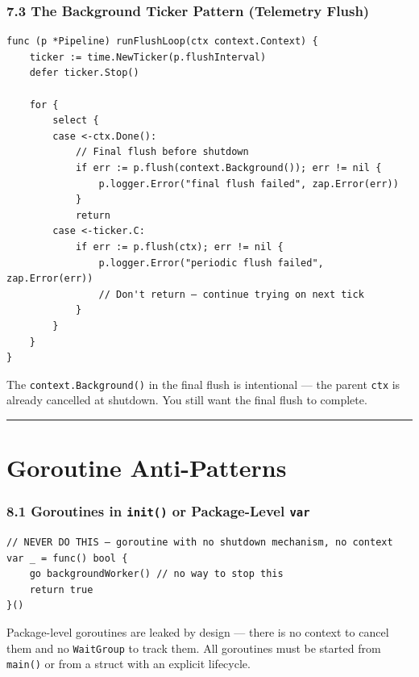 \documentclass[11pt,a4paper,oneside]{book}
\begin{document}
\subsubsection{7.3 The Background Ticker Pattern (Telemetry
Flush)}

\begin{verbatim}
func (p *Pipeline) runFlushLoop(ctx context.Context) {
    ticker := time.NewTicker(p.flushInterval)
    defer ticker.Stop()

    for {
        select {
        case <-ctx.Done():
            // Final flush before shutdown
            if err := p.flush(context.Background()); err != nil {
                p.logger.Error("final flush failed", zap.Error(err))
            }
            return
        case <-ticker.C:
            if err := p.flush(ctx); err != nil {
                p.logger.Error("periodic flush failed", zap.Error(err))
                // Don't return — continue trying on next tick
            }
        }
    }
}
\end{verbatim}

The \texttt{context.Background()} in the final flush is intentional ---
the parent \texttt{ctx} is already cancelled at shutdown. You still want
the final flush to complete.

\begin{center}\rule{0.5\linewidth}{0.5pt}\end{center}

\section{Goroutine Anti-Patterns}

\subsubsection{\texorpdfstring{8.1 Goroutines in \texttt{init()} or
Package-Level
\texttt{var}}{8.1 Goroutines in init() or Package-Level var}}

\begin{verbatim}
// NEVER DO THIS — goroutine with no shutdown mechanism, no context
var _ = func() bool {
    go backgroundWorker() // no way to stop this
    return true
}()
\end{verbatim}

Package-level goroutines are leaked by design --- there is no context to
cancel them and no \texttt{WaitGroup} to track them. All goroutines must
be started from \texttt{main()} or from a struct with an explicit
lifecycle.
\end{document}
